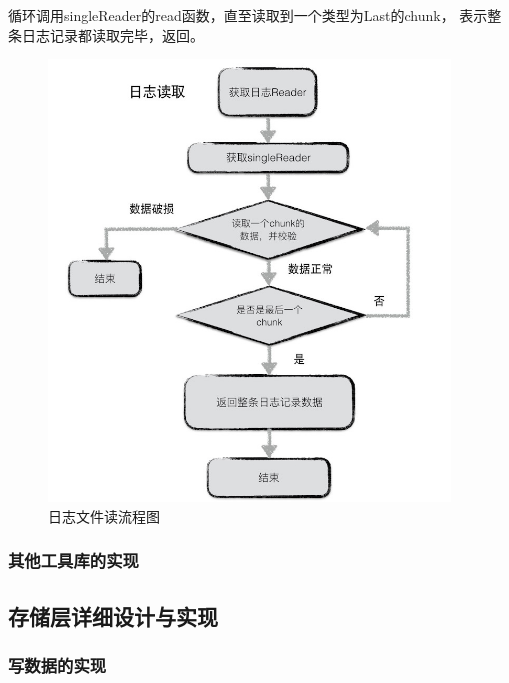 \begin{enumerate}
		循环调用singleReader的read函数，直至读取到一个类型为Last的chunk，
		表示整条日志记录都读取完毕，返回。

		\begin{figure}[H]
			\centering
			\includegraphics[width=0.95\textwidth]{images/journal_read}
			\caption{日志文件读流程图}
			\label{journal_read}
		\end{figure}
		
		
	
		\end{enumerate}
	
   		\subsubsection{其他工具库的实现}
    


  	\subsection{存储层详细设计与实现}
	
		\subsubsection{写数据的实现}
		
